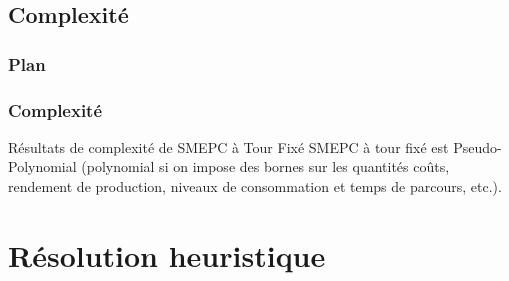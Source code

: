 \documentclass[hyperref={bookmarks=false},aspectratio=169]{beamer}
\begin{document}


\subsection{Complexité}
\begin{frame}
\frametitle{Plan}
\addtocounter{framenumber}{-1}
\end{frame}


\begin{frame}
\frametitle{Complexité}



 \begin{block}{Résultats de complexité de SMEPC à Tour Fixé}
SMEPC à tour fixé est Pseudo-Polynomial (polynomial si on
impose des bornes sur les quantités coûts, rendement de production, niveaux de consommation et temps de
parcours, etc.).
 \end{block}
 \end{frame}
 

\section{Résolution heuristique}

\end{document}
